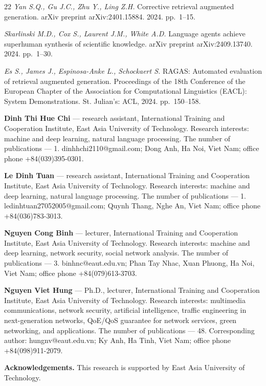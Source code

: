 \documentclass[10pt]{SPIIRAS_Proceedings}
\begin{document}
\begin{thebibliography}{22}
\emph{Yan S.Q., Gu J.C., Zhu Y., Ling Z.H.} Corrective retrieval augmented generation. arXiv preprint arXiv:2401.15884. 2024. pp.~1--15.

\emph{Skarlinski M.D., Cox S., Laurent J.M., White A.D.} Language agents achieve superhuman synthesis of scientific knowledge. arXiv preprint arXiv:2409.13740. 2024. pp.~1--30.

\emph{Es S., James J., Espinosa-Anke L., Schockaert S.} RAGAS: Automated evaluation of retrieval augmented generation. Proceedings of the 18th Conference of the European Chapter of the Association for Computational Linguistics (EACL): System Demonstrations. St. Julian's: ACL, 2024. pp.~150--158.

\end{thebibliography}

\begin{aboutAuthors}
    \textbf{Dinh Thi Hue Chi} --- research assistant, International Training and Cooperation Institute, East Asia University of Technology. Research interests: machine and deep learning, natural language processing. The number of publications --- 1. dinhhchi2110@gmail.com; Dong Anh, Ha Noi, Viet Nam; office phone +84(039)395-0301.\smallskip
    
    \textbf{Le Dinh Tuan} --- research assistant, International Training and Cooperation Institute, East Asia University of Technology. Research interests: machine and deep learning, natural language processing. The number of publications --- 1. ledinhtuan27052005@gmail.com; Quynh Thang, Nghe An, Viet Nam; office phone +84(036)783-3013.\smallskip

    \textbf{Nguyen Cong Binh} --- lecturer, International Training and Cooperation Institute, East Asia University of Technology. Research interests: machine and deep learning, network security, social network analysis. The number of publications --- 3. binhnc@eaut.edu.vn; Phan Tay Nhac, Xuan Phuong, Ha Noi, Viet Nam; office phone +84(079)613-3703.\smallskip

    \textbf{Nguyen Viet Hung} --- Ph.D., lecturer, International Training and Cooperation Institute, East Asia University of Technology. Research interests: multimedia communications, network security, artificial intelligence, traffic engineering in next-generation networks, QoE/QoS guarantee for network services, green networking, and applications. The number of publications --- 48. Corresponding author: hungnv@eaut.edu.vn; Ky Anh, Ha Tinh, Viet Nam; office phone +84(098)911-2079.\smallskip

    \textbf{Acknowledgements.} This research is supported by East Asia University of Technology.
\end{aboutAuthors}
\end{document}
